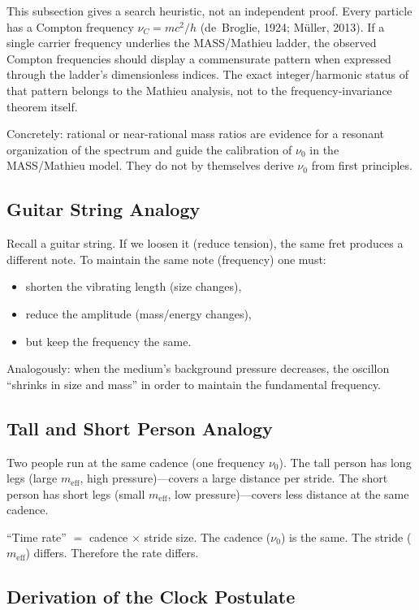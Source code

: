 \documentclass[11pt]{article}
\begin{document}
This subsection gives a search heuristic, not an independent proof.
Every particle has a Compton frequency
$\nu_C = mc^2/h$ (de~Broglie, 1924; M\"uller, 2013).  If a single
carrier frequency underlies the MASS/Mathieu ladder, the observed
Compton frequencies should display a commensurate pattern when
expressed through the ladder's dimensionless indices.  The exact
integer/harmonic status of that pattern belongs to the Mathieu
analysis, not to the frequency-invariance theorem itself.

Concretely: rational or near-rational mass ratios are evidence for
a resonant organization of the spectrum and guide the calibration
of $\nu_0$ in the MASS/Mathieu model.  They do not by themselves
derive $\nu_0$ from first principles.

\subsection{Guitar String Analogy}

Recall a guitar string. If we loosen it (reduce tension), the same
fret produces a different note. To maintain the same note
(frequency) one must:
\begin{itemize}
  \item shorten the vibrating length (size changes),
  \item reduce the amplitude (mass/energy changes),
  \item but keep the frequency the same.
\end{itemize}

Analogously: when the medium's background pressure decreases, the
oscillon ``shrinks in size and mass'' in order to maintain the
fundamental frequency.

\subsection{Tall and Short Person Analogy}

Two people run at the same cadence (one frequency $\nu_0$). The
tall person has long legs (large $m_{\mathrm{eff}}$, high
pressure)---covers a large distance per stride. The short person
has short legs (small $m_{\mathrm{eff}}$, low pressure)---covers
less distance at the same cadence.

``Time rate'' $=$ cadence $\times$ stride size. The cadence
($\nu_0$) is the same. The stride ($m_{\mathrm{eff}}$) differs.
Therefore the rate differs.

\subsection{Derivation of the Clock Postulate}
\end{document}
